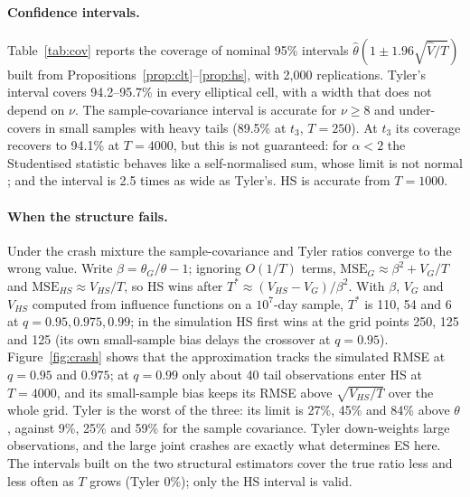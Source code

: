 \documentclass[11pt]{article}
\theoremstyle{remark}
\begin{document}
\begin{table}[H]
\centering\small
\caption{Slope of $\log\mathrm{IQR}(\hat\theta/\theta-1)$ on $\log T$, $T=125,\dots,4000$, $q=0.95$. $\sqrt T$
convergence corresponds to $-0.5$.}
\label{tab:rates}

\end{table}

\paragraph{Confidence intervals.}
Table~\ref{tab:cov} reports the coverage of nominal 95\% intervals $\hat\theta(1\pm1.96\sqrt{\hat V/T})$ built
from Propositions~\ref{prop:clt}--\ref{prop:hs}, with 2{,}000 replications. Tyler's interval covers 94.2--95.7\%
in every elliptical cell, with a width that does not depend on $\nu$. The sample-covariance interval is accurate
for $\nu\ge8$ and under-covers in small samples with heavy tails (89.5\% at $t_3$, $T=250$). At $t_3$ its
coverage recovers to 94.1\% at $T=4000$, but this is not guaranteed: for $\alpha<2$ the Studentised statistic
behaves like a self-normalised sum, whose limit is not normal \citep{logan1973}; and the interval is 2.5 times
as wide as Tyler's. HS is accurate from $T=1000$.

\begin{table}[H]
\centering\small
\caption{Coverage (\%) of nominal 95\% intervals for the true ES ratio, $q=0.95$, 2{,}000 replications
(Monte Carlo s.e.\ about 0.5 points), by sample size $T$.}
\label{tab:cov}

\end{table}

\paragraph{When the structure fails.}
Under the crash mixture the sample-covariance and Tyler ratios converge to the wrong value. Write
$\beta=\theta_G/\theta-1$; ignoring $O(1/T)$ terms, $\mathrm{MSE}_G\approx\beta^2+V_G/T$ and
$\mathrm{MSE}_{HS}\approx V_{HS}/T$, so HS wins after $T^*\approx(V_{HS}-V_G)/\beta^2$. With $\beta$, $V_G$ and
$V_{HS}$ computed from influence functions on a $10^7$-day sample, $T^*$ is 110, 54 and 6 at $q=0.95,0.975,0.99$;
in the simulation HS first wins at the grid points 250, 125 and 125 (its own small-sample bias delays the
crossover at $q=0.95$). Figure~\ref{fig:crash} shows that the approximation tracks the simulated RMSE at $q=0.95$ and $0.975$; at $q=0.99$ only about 40 tail observations enter HS at $T=4000$, and its small-sample bias keeps its RMSE above $\sqrt{V_{HS}/T}$ over the whole grid. Tyler is
the worst of the three: its limit is 27\%, 45\% and 84\% above $\theta$, against 9\%, 25\% and 59\% for the
sample covariance. Tyler down-weights large observations, and the large joint crashes are exactly what
determines ES here. The intervals built on the two structural estimators cover the true ratio less and less
often as $T$ grows (Tyler 0\%); only the HS interval is valid.
\end{document}
